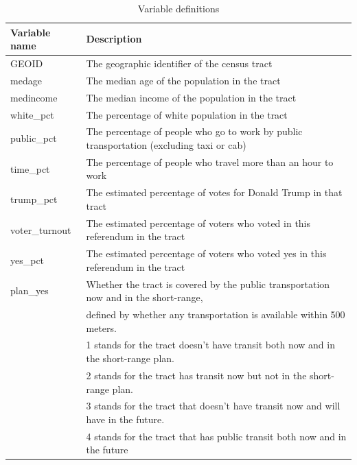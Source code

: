 \documentclass[
]{article}
\begin{document}
\begin{table}
\centering
\caption{Variable definitions}
\label{variableDefinitions}
\begin{tabular}{ll}
\hline
\hline
Variable name      & Description                                   \\
\hline
GEOID          & The geographic identifier of the census tract                 \\
medage        & The median age of the population in the tract               \\
medincome        & The median income of the population in the tract               \\
white\_pct           & The percentage of white population in the tract      \\
public\_pct          & The percentage of people who go to work by public transportation (excluding taxi or cab)      \\
time\_pct           & The percentage of people who travel more than an hour to work      \\
trump\_pct          & The estimated percentage of votes for Donald Trump in that tract      \\
voter\_turnout  & The estimated percentage of voters who voted in this referendum in the tract \\
yes\_pct           & The estimated percentage of voters who voted yes in this referendum in the tract      \\
plan\_yes          & Whether the tract is covered by the public transportation now and in the short-range, \\ & defined by whether any transportation is available within 500 meters. \\ & 1 stands for the tract doesn't have transit both now and in the short-range plan. \\ & 2 stands for the tract has transit now but not in the short-range plan. \\ & 3 stands for the tract that doesn't have transit now and will have in the future.\\ & 4 stands for the tract that has public transit both now and in the future      \\

\hline
\end{tabular}
\end{table}
\end{document}

